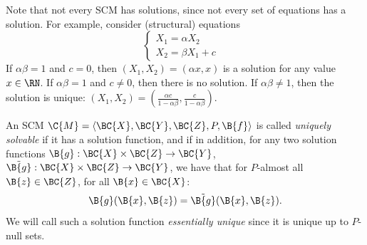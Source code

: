 Note that not every SCM has solutions, since not every set of equations has a solution. 
For example, consider (structural) equations
$$\begin{cases}
  X_1 = \alpha X_2 & \\
  X_2 = \beta X_1 + c &
\end{cases}$$
If $\alpha \beta = 1$ and $c = 0$, then $(X_1,X_2) = (\alpha x,x)$ is a solution for any value $x\in\RN$. 
If $\alpha \beta = 1$ and $c \ne 0$, then there is no solution. 
If $\alpha \beta \ne 1$, then the solution is unique: $(X_1,X_2) = (\frac{\alpha c}{1 - \alpha\beta},\frac{c}{1 - \alpha\beta})$.

\begin{Def}\label{def:scm_unique_solvability}
  An SCM $\C{M} = \langle \BC{X}, \BC{Y}, \BC{Z}, P, \B{f} \rangle$ is called \emph{uniquely solvable} if it has a solution function, and if in addition,
  for any two solution functions $\B{g} : \BC{X} \times \BC{Z} \to \BC{Y}$, $\tilde{\B{g}} : \BC{X} \times \BC{Z} \to \BC{Y}$,
  we have that for $P$-almost all $\B{z}\in\BC{Z}$, for all $\B{x}\in\BC{X}$:
  $$\B{g}(\B{x},\B{z}) = \tilde{\B{g}}(\B{x},\B{z}).$$
  We will call such a solution function \emph{essentially unique} since it is unique up to $P$-null sets.
\end{Def}


